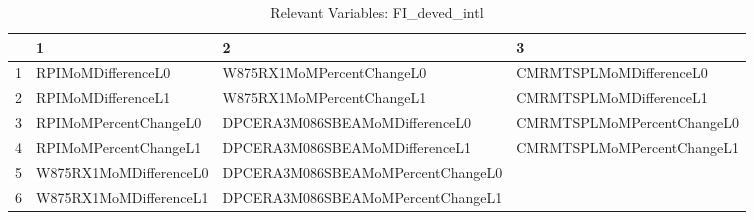\begin{longtable}{rlll}
\caption{Relevant Variables: FI_deved_intl} \\ 
  \hline
 & 1 & 2 & 3 \\ 
  \hline
1 & RPIMoMDifferenceL0 & W875RX1MoMPercentChangeL0 & CMRMTSPLMoMDifferenceL0 \\ 
  2 & RPIMoMDifferenceL1 & W875RX1MoMPercentChangeL1 & CMRMTSPLMoMDifferenceL1 \\ 
  3 & RPIMoMPercentChangeL0 & DPCERA3M086SBEAMoMDifferenceL0 & CMRMTSPLMoMPercentChangeL0 \\ 
  4 & RPIMoMPercentChangeL1 & DPCERA3M086SBEAMoMDifferenceL1 & CMRMTSPLMoMPercentChangeL1 \\ 
  5 & W875RX1MoMDifferenceL0 & DPCERA3M086SBEAMoMPercentChangeL0 &  \\ 
  6 & W875RX1MoMDifferenceL1 & DPCERA3M086SBEAMoMPercentChangeL1 &  \\ 
   \hline
\hline
\end{longtable}
